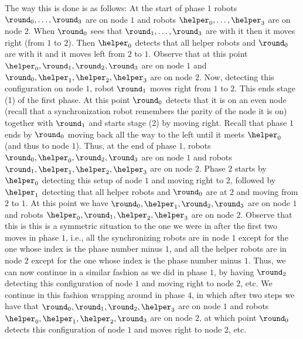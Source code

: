 The way this is done is as follows:
At the start of phase $1$ robots $\round_0,\ldots,\round_3$ are on node $1$ and
robots $\helper_0,\ldots,\helper_3$ are on node $2$. When $\round_0$ sees that
$\round_1,\ldots,\round_3$ are with it then it moves right (from $1$ to $2$).
Then $\helper_0$ detects that all helper robots and $\round_0$ are with it and
it moves left from $2$ to $1$. Observe that at this point
$\helper_0,\round_1,\round_2,\round_3$ are on node $1$ and $\round_0, \helper_1,
\helper_2,\helper_3$ are on node $2$.
Now, detecting this configuration on node $1$, robot $\round_1$ moves right from
$1$ to $2$. This ends stage (1) of the first phase.
At this point $\round_0$ detects that it is on an even node (recall that a
synchronization robot remembers the parity of the node it is on) together with
$\round_1$ and starts stage (2) by moving right.
Recall that phase $1$ ends by $\round_0$ moving back all the way to the left
until it meets $\helper_0$ (and thus to node $1$). Thus, at the end of phase
$1$, robots $\round_0,\helper_0,\round_2,\round_3$ are on node $1$ and robots
$\round_1, \helper_1, \helper_2,\helper_3$ are on node $2$.
Phase $2$ starts by $\helper_0$ detecting this setup of node $1$ and moving
right to $2$, followed by $\helper_1$ detecting that all helper robots and
$\round_0$ are at $2$ and moving from $2$ to $1$.
At this point we have $\round_0,\helper_1,\round_2,\round_3$ are on node $1$ and
robots $\helper_0, \round_1, \helper_2,\helper_3$ are on node $2$. Observe that
this is this is a symmetric situation to the one we were in after the first two
moves in phase $1$, i.e., all the synchronizing robots are in node $1$ except
for the one whose index is the phase number minus $1$, and all the helper robots
are in node $2$ except for the one whose index is the phase number minus $1$.
Thus, we can now continue in a similar fashion as we did in phase $1$, by having
$\round_2$ detecting this configuration of node $1$ and moving right to node
$2$, etc. We continue in this fashion wrapping around in phase $4$, in which
after two steps we have that $\round_0,\round_1,\round_2, \helper_3$ are on node
$1$ and robots $\helper_0, \helper_1,\helper_2, \round_3$ are on node $2$, at
which point $\round_0$ detects this configuration of node $1$ and moves right to
node $2$, etc.



